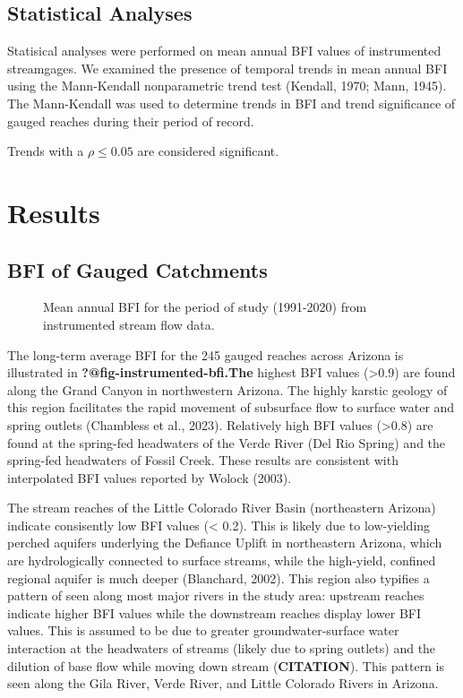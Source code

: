 \documentclass[
]{agujournal2019}
\begin{document}
\subsection{Statistical Analyses}\label{statistical-analyses}

Statisical analyses were performed on mean annual BFI values of
instrumented streamgages. We examined the presence of temporal trends in
mean annual BFI using the Mann-Kendall nonparametric trend test
(Kendall, 1970; Mann, 1945). The Mann-Kendall was used to determine
trends in BFI and trend significance of gauged reaches during their
period of record.

Trends with a \(\rho \le 0.05\) are considered significant.

\section{Results}\label{results}

\subsection{BFI of Gauged Catchments}\label{bfi-of-gauged-catchments}

\begin{figure}


\caption{\label{fig-instrumented-bfi}Mean annual BFI for the period of
study (1991-2020) from instrumented stream flow data.}

\end{figure}%

The long-term average BFI for the 245 gauged reaches across Arizona is
illustrated in \textbf{?@fig-instrumented-bfi.The} highest BFI values
(\textgreater0.9) are found along the Grand Canyon in northwestern
Arizona. The highly karstic geology of this region facilitates the rapid
movement of subsurface flow to surface water and spring outlets
(Chambless et al., 2023). Relatively high BFI values (\textgreater0.8)
are found at the spring-fed headwaters of the Verde River (Del Rio
Spring) and the spring-fed headwaters of Fossil Creek. These results are
consistent with interpolated BFI values reported by Wolock (2003).

The stream reaches of the Little Colorado River Basin (northeastern
Arizona) indicate consisently low BFI values (\textless{} 0.2). This is
likely due to low-yielding perched aquifers underlying the Defiance
Uplift in northeastern Arizona, which are hydrologically connected to
surface streams, while the high-yield, confined regional aquifer is much
deeper (Blanchard, 2002). This region also typifies a pattern of seen
along most major rivers in the study area: upstream reaches indicate
higher BFI values while the downstream reaches display lower BFI values.
This is assumed to be due to greater groundwater-surface water
interaction at the headwaters of streams (likely due to spring outlets)
and the dilution of base flow while moving down stream
(\textbf{CITATION}). This pattern is seen along the Gila River, Verde
River, and Little Colorado Rivers in Arizona.
\end{document}
